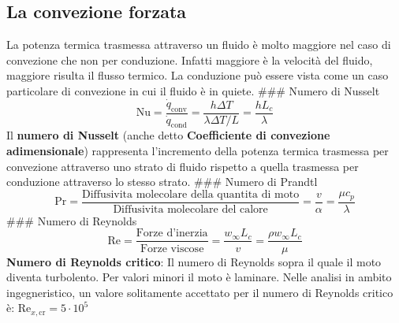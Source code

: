 \hypertarget{la-convezione-forzata}{%
\subsection{La convezione forzata}\label{la-convezione-forzata}}

La potenza termica trasmessa attraverso un fluido è molto maggiore nel
caso di convezione che non per conduzione. Infatti maggiore è la
velocità del fluido, maggiore risulta il flusso termico. La conduzione
può essere vista come un caso particolare di convezione in cui il fluido
è in quiete. \#\#\# Numero di Nusselt
\[\text{Nu}=\frac{\dot q_\text{conv}}{\dot q_\text{cond}}=\frac{h\Delta T}{\lambda\Delta T/L}=\frac{hL_c}{\lambda}\]
Il \textbf{numero di Nusselt} (anche detto \textbf{Coefficiente di
convezione adimensionale}) rappresenta l'incremento della potenza
termica trasmessa per convezione attraverso uno strato di fluido
rispetto a quella trasmessa per conduzione attraverso lo stesso strato.
\#\#\# Numero di Prandtl
\[\text{Pr}=\frac{\text{Diffusivita molecolare della quantita di moto}}{\text{Diffusivita molecolare del calore}}=\frac{v}{\alpha}=\frac{\mu c_p}{\lambda}\]
\#\#\# Numero di Reynolds
\[\text{Re}=\frac{\text{Forze d'inerzia}}{\text{Forze viscose}}=\frac{w_\infty L_c}{v}=\frac{\rho w_\infty L_c}{\mu}\]
\textbf{Numero di Reynolds critico}: Il numero di Reynolds sopra il
quale il moto diventa turbolento. Per valori minori il moto è laminare.
Nelle analisi in ambito ingegneristico, un valore solitamente accettato
per il numero di Reynolds critico è:
\(\text{Re}_{x,\text{cr}}=5\cdot 10^5\)
